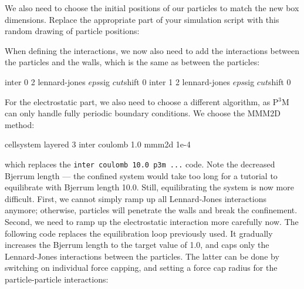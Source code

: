 \documentclass[
a4paper,                        %
11pt,                           %
twoside,                        %
footsepline,                    %
headsepline,                    %
headexclude,                    %
footexclude,                    %
pagesize,                       %
]{scrartcl}
\begin{document}
We also need to choose the initial positions of our particles to match
the new box dimensions. Replace the appropriate part of your
simulation script with this random drawing of particle positions:


When defining the interactions, we now also need to add the
interactions between the particles and the walls, which is the same as
between the particles:

\begin{tclcode}
  inter 0 2 lennard-jones $eps $sig $cut $shift 0
  inter 1 2 lennard-jones $eps $sig $cut $shift 0
\end{tclcode}

For the electrostatic part, we also need to choose a different algorithm,
as P$^3$M can only handle fully periodic boundary conditions. We
choose the MMM2D method:

\begin{tclcode}
  cellsystem layered 3
  inter coulomb 1.0 mmm2d 1e-4  
\end{tclcode}

which replaces the \verb|inter coulomb 10.0 p3m ...| code. Note the
decreased Bjerrum length --- the confined system would take too long for
a tutorial to equilibrate with Bjerrum length 10.0. Still,
equilibrating the system is now more difficult. First, we cannot
simply ramp up all Lennard-Jones interactions anymore; otherwise,
particles will penetrate the walls and break the confinement. Second,
we need to ramp up the electrostatic interaction more carefully
now. The following code replaces the equilibration loop previously 
used. It gradually increases the Bjerrum length to the
target value of 1.0, and caps only the Lennard-Jones interactions
between the particles. The latter can be done by switching on
individual force capping, and setting a force cap radius for the
particle-particle interactions:

\end{document}
